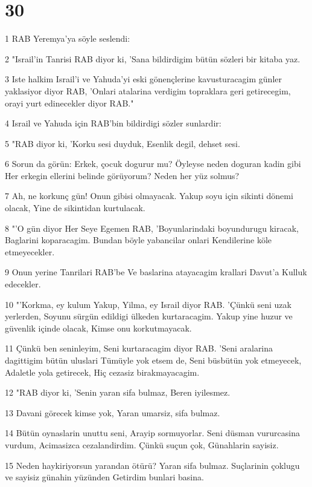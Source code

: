 \chapter{30}

\par 1 RAB Yeremya'ya söyle seslendi:
\par 2 "Israil'in Tanrisi RAB diyor ki, 'Sana bildirdigim bütün sözleri bir kitaba yaz.
\par 3 Iste halkim Israil'i ve Yahuda'yi eski gönençlerine kavusturacagim günler yaklasiyor diyor RAB, 'Onlari atalarina verdigim topraklara geri getirecegim, orayi yurt edinecekler diyor RAB."
\par 4 Israil ve Yahuda için RAB'bin bildirdigi sözler sunlardir:
\par 5 "RAB diyor ki, 'Korku sesi duyduk, Esenlik degil, dehset sesi.
\par 6 Sorun da görün: Erkek, çocuk dogurur mu? Öyleyse neden doguran kadin gibi Her erkegin ellerini belinde görüyorum? Neden her yüz solmus?
\par 7 Ah, ne korkunç gün! Onun gibisi olmayacak. Yakup soyu için sikinti dönemi olacak, Yine de sikintidan kurtulacak.
\par 8 "'O gün diyor Her Seye Egemen RAB, 'Boyunlarindaki boyundurugu kiracak, Baglarini koparacagim. Bundan böyle yabancilar onlari Kendilerine köle etmeyecekler.
\par 9 Onun yerine Tanrilari RAB'be Ve baslarina atayacagim krallari Davut'a Kulluk edecekler.
\par 10 "'Korkma, ey kulum Yakup, Yilma, ey Israil diyor RAB. 'Çünkü seni uzak yerlerden, Soyunu sürgün edildigi ülkeden kurtaracagim. Yakup yine huzur ve güvenlik içinde olacak, Kimse onu korkutmayacak.
\par 11 Çünkü ben seninleyim, Seni kurtaracagim diyor RAB. 'Seni aralarina dagittigim bütün uluslari Tümüyle yok etsem de, Seni büsbütün yok etmeyecek, Adaletle yola getirecek, Hiç cezasiz birakmayacagim.
\par 12 "RAB diyor ki, 'Senin yaran sifa bulmaz, Beren iyilesmez.
\par 13 Davani görecek kimse yok, Yaran umarsiz, sifa bulmaz.
\par 14 Bütün oynaslarin unuttu seni, Arayip sormuyorlar. Seni düsman vururcasina vurdum, Acimasizca cezalandirdim. Çünkü suçun çok, Günahlarin sayisiz.
\par 15 Neden haykiriyorsun yarandan ötürü? Yaran sifa bulmaz. Suçlarinin çoklugu ve sayisiz günahin yüzünden Getirdim bunlari basina.
